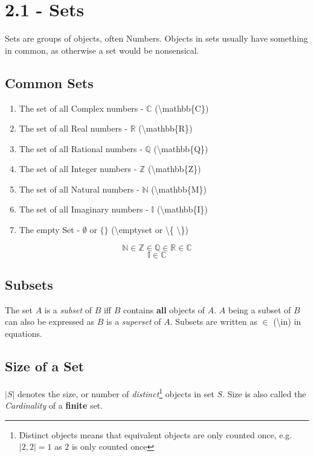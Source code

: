 \documentclass{article}
\begin{document}
    \section{2.1 - Sets}
        Sets are groups of objects, often Numbers.
        Objects in sets usually have something in common, as otherwise a set would be nonsensical.
        \subsection{Common Sets}
            \begin{enumerate}
                \item The set of all Complex numbers - $\mathbb{C}$ (\textbackslash mathbb\{C\})
                \item The set of all Real numbers - $\mathbb{R}$ (\textbackslash mathbb\{R\})
                \item The set of all Rational numbers - $\mathbb{Q}$ (\textbackslash mathbb\{Q\})
                \item The set of all Integer numbers - $\mathbb{Z}$ (\textbackslash mathbb\{Z\})
                \item The set of all Natural numbers - $\mathbb{N}$ (\textbackslash mathbb\{M\})
                \item The set of all Imaginary numbers - $\mathbb{I}$ (\textbackslash mathbb\{I\})
                \item The empty Set - $\emptyset$ or $\{\}$ (\textbackslash emptyset or \textbackslash \{ \textbackslash \})
            \end{enumerate}
            $$\mathbb{N} \in \mathbb{Z} \in \mathbb{Q} \in \mathbb{R} \in \mathbb{C}$$
            $$\mathbb{I} \in \mathbb{C}$$
        \subsection{Subsets}
            The set $A$ is a \textit{subset} of $B$ iff $B$ contains \textbf{all} objects of $A$.
            $A$ being a subset of $B$ can also be expressed as $B$ is a \textit{superset} of $A$.
            Subsets are written as $\in$ (\textbackslash in) in equations.
        \subsection{Size of a Set}
            $| S |$ denotes the size, or number of \textit{distinct}\footnote{Distinct objects means that equivalent objects are only counted once, e.g. $|{2, 2}| = 1$ as $2$ is only counted once} objects in set $S$.
            Size is also called the \textit{Cardinality} of a \textbf{finite} set.
\end{document}
